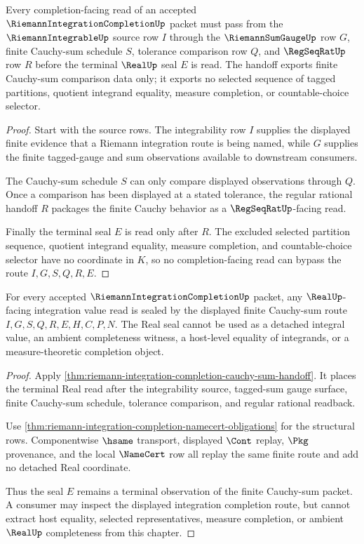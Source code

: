 \begin{theorem}
\label{thm:riemann-integration-completion-cauchy-sum-handoff}
Every completion-facing read of an accepted $\RiemannIntegrationCompletionUp$ packet must pass from the $\RiemannIntegrableUp$ source row $I$ through the $\RiemannSumGaugeUp$ row $G$, finite Cauchy-sum schedule $S$, tolerance comparison row $Q$, and $\RegSeqRatUp$ row $R$ before the terminal $\RealUp$ seal $E$ is read. The handoff exports finite Cauchy-sum comparison data only; it exports no selected sequence of tagged partitions, quotient integrand equality, measure completion, or countable-choice selector.
\end{theorem}
\begin{proof}
Start with the source rows. The integrability row $I$ supplies the displayed finite evidence that a Riemann integration route is being named, while $G$ supplies the finite tagged-gauge and sum observations available to downstream consumers.

The Cauchy-sum schedule $S$ can only compare displayed observations through $Q$. Once a comparison has been displayed at a stated tolerance, the regular rational handoff $R$ packages the finite Cauchy behavior as a $\RegSeqRatUp$-facing read.

Finally the terminal seal $E$ is read only after $R$. The excluded selected partition sequence, quotient integrand equality, measure completion, and countable-choice selector have no coordinate in $K$, so no completion-facing read can bypass the route $I,G,S,Q,R,E$.
\end{proof}

\begin{theorem}
\label{thm:riemann-integration-completion-real-seal-nonescape}
For every accepted $\RiemannIntegrationCompletionUp$ packet, any $\RealUp$-facing integration value read is sealed by the displayed finite Cauchy-sum route $I,G,S,Q,R,E,H,C,P,N$. The Real seal cannot be used as a detached integral value, an ambient completeness witness, a host-level equality of integrands, or a measure-theoretic completion object.
\end{theorem}
\begin{proof}
Apply \autoref{thm:riemann-integration-completion-cauchy-sum-handoff}. It places the terminal Real read after the integrability source, tagged-sum gauge surface, finite Cauchy-sum schedule, tolerance comparison, and regular rational readback.

Use \autoref{thm:riemann-integration-completion-namecert-obligations} for the structural rows. Componentwise $\hsame$ transport, displayed $\Cont$ replay, $\Pkg$ provenance, and the local $\NameCert$ row all replay the same finite route and add no detached Real coordinate.

Thus the seal $E$ remains a terminal observation of the finite Cauchy-sum packet. A consumer may inspect the displayed integration completion route, but cannot extract host equality, selected representatives, measure completion, or ambient $\RealUp$ completeness from this chapter.
\end{proof}

